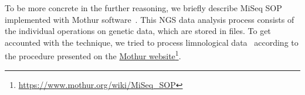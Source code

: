 \documentclass[a4paper]{jpconf}
\begin{document}
To be more concrete in the further reasoning, we briefly describe MiSeq SOP implemented with Mothur software~\cite{mothur}.  This NGS data analysis process consists of the individual operations on genetic data, which are stored in files. To get accounted with the technique, we tried to process limnological data~\cite{mik19} according to the procedure presented on the \href{https://www.mothur.org/wiki/MiSeq_SOP}{Mothur website}\footnote{\url{https://www.mothur.org/wiki/MiSeq_SOP}}. %



\end{document}
